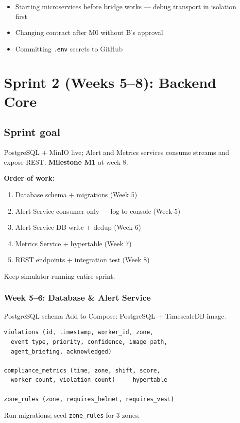 \documentclass[12pt,a4paper]{report}
\begin{document}
\begin{pitfallbox}
\begin{itemize}
    \item Starting microservices before bridge works --- debug transport in isolation first
    \item Changing contract after M0 without B's approval
    \item Committing \texttt{.env} secrets to GitHub
\end{itemize}
\end{pitfallbox}

\chapter{Sprint 2 (Weeks 5--8): Backend Core}

\section{Sprint goal}

PostgreSQL + MinIO live; Alert and Metrics services consume streams and expose REST. \textbf{Milestone M1} at week 8.

\begin{approachbox}
\textbf{Order of work:}
\begin{enumerate}
    \item Database schema + migrations (Week 5)
    \item Alert Service consumer only --- log to console (Week 5)
    \item Alert Service DB write + dedup (Week 6)
    \item Metrics Service + hypertable (Week 7)
    \item REST endpoints + integration test (Week 8)
\end{enumerate}
Keep simulator running entire sprint.
\end{approachbox}

\subsection{Week 5--6: Database \& Alert Service}

\begin{stepbox}{PostgreSQL schema}
Add to Compose: PostgreSQL + TimescaleDB image.
\begin{verbatim}
violations (id, timestamp, worker_id, zone,
  event_type, priority, confidence, image_path,
  agent_briefing, acknowledged)

compliance_metrics (time, zone, shift, score,
  worker_count, violation_count)  -- hypertable

zone_rules (zone, requires_helmet, requires_vest)
\end{verbatim}
Run migrations; seed \texttt{zone\_rules} for 3 zones.
\end{stepbox}
\end{document}
